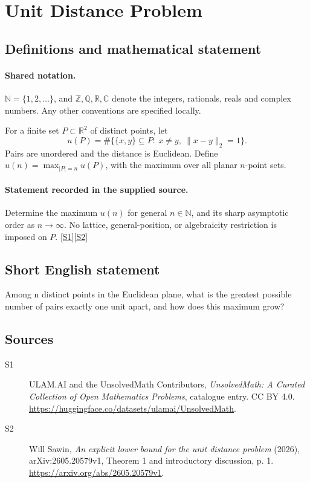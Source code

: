 \documentclass[11pt]{article}
\newcommand{\sref}[2]{\hyperlink{source:#1:#2}{[S#2]}}
\begin{document}
\section{Unit Distance Problem}\label{statement}

\subsection{Definitions and mathematical statement}

\paragraph{Shared notation.}$\mathbb N=\{1,2,\ldots\}$, and $\mathbb Z,\mathbb Q,\mathbb R,\mathbb C$ denote the integers, rationals, reals and complex numbers. Any other conventions are specified locally.


For a finite set $P\subset\mathbb R^2$ of distinct points, let
\[
 u(P)=\#\{\{x,y\}\subseteq P:\ x\ne y,\ \|x-y\|_2=1\}.
\]
Pairs are unordered and the distance is Euclidean. Define $u(n)=\max_{|P|=n}u(P)$, with the maximum over all planar $n$-point sets.
\paragraph{Statement recorded in the supplied source.}
Determine the maximum $u(n)$ for general $n\in\mathbb N$, and its sharp asymptotic order as $n\to\infty$. No lattice, general-position, or algebraicity restriction is imposed on $P$. \sref{statement}{1}\sref{statement}{2}
\subsection{Short English statement}
Among n distinct points in the Euclidean plane, what is the greatest possible number of pairs exactly one unit apart, and how does this maximum grow?
\subsection{Sources}
\begin{description}
\item[\hypertarget{source:statement:1}{S1}] ULAM.AI and the UnsolvedMath Contributors, \emph{UnsolvedMath: A Curated Collection of Open Mathematics Problems}, catalogue entry. CC BY 4.0. \url{https://huggingface.co/datasets/ulamai/UnsolvedMath}.
\item[\hypertarget{source:statement:2}{S2}] Will Sawin, \emph{An explicit lower bound for the unit distance problem} (2026), arXiv:2605.20579v1, Theorem 1 and introductory discussion, p. 1. \url{https://arxiv.org/abs/2605.20579v1}.
\end{description}
\label{end:statement}
\end{document}
